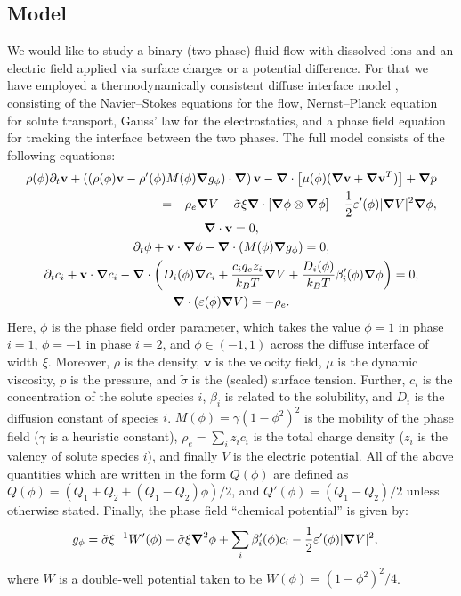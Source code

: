 \documentclass[a4paper,10pt]{article}
\renewcommand{\v}[1]{\mathbf{#1}}
\renewcommand{\v}[1]{\ensuremath{\mathbf{#1}}} %
\newcommand{\gv}[1]{\ensuremath{\mbox{\boldmath$ #1 $}}}
\newcommand{\grad}[1]{\gv{\nabla} #1} %
\renewcommand{\div}[1]{\gv{\nabla} \cdot #1} %
\newcommand{\laplacian}[1]{\grad^2 #1}
\newcommand{\pdt}[1]{\partial_t #1}
\begin{document}
\subsection*{Model}
We would like to study a binary (two-phase) fluid flow with dissolved ions and an electric field applied via surface charges or a potential difference.
For that we have employed a thermodynamically consistent diffuse interface model \cite{abels2012}, consisting of the Navier--Stokes equations for the flow, Nernst--Planck equation for solute transport, Gauss' law for the electrostatics, and a phase field equation for tracking the interface between the two phases.
The full model consists of the following equations:
\begin{gather}
  \begin{split}
  \rho(\phi) \pdt \v v + \left( \left(\rho(\phi) \v v - \rho'(\phi) M(\phi) \grad g_\phi  \right) \cdot \grad \right) \v v - \div \left[  \mu(\phi)(\grad \v v + \grad \v v ^T) \right] + \grad p \\
  = - \rho_e \grad V - \tilde \sigma \xi\div \left[ \grad \phi \otimes \grad \phi \right] - \frac 1 2 \varepsilon'(\phi) | \grad V |^2 \grad \phi,
  \end{split}\\
  \div \v v = 0, \\
  \pdt \phi + \v v \cdot \grad \phi - \div(M(\phi) \grad g_\phi ) = 0, \\
  \pdt c_i + \v v \cdot \grad c_i - \div \left( D_{i} (\phi) \grad c_i + \frac{c_i q_e  z_i}{k_B T} \grad V +\frac{D_i(\phi)}{k_B T}\beta_i'(\phi) \grad \phi \right) = 0, \\
  \div ( \varepsilon (\phi) \grad V ) = - \rho_e.
\end{gather}
Here, $\phi$ is the phase field order parameter, which takes the value $\phi = 1$ in phase $i=1$, $\phi = -1$ in phase $i=2$, and $\phi \in (-1, 1)$ across the diffuse interface of width $\xi$.
Moreover, $\rho$ is the density, $\v v$ is the velocity field, $\mu$ is the dynamic viscosity, $p$ is the pressure, and $\tilde{\sigma}$ is the (scaled) surface tension.
Further, $c_i$ is the concentration of the solute species $i$, $\beta_i$ is related to the solubility, and $D_i$ is the diffusion constant of species $i$. $M(\phi)= \gamma (1 - \phi^2)^2$ is the mobility of the phase field ($\gamma$ is a heuristic constant), $\rho_e = \sum_i z_i c_i$ is the total charge density ($z_i$ is the valency of solute species $i$), and finally $V$ is the electric potential. All of the above quantities which are written in the form $Q(\phi)$ are defined as $Q(\phi) = (Q_1+Q_2 + (Q_1-Q_2)\phi)/2$, and $Q'(\phi) = (Q_1-Q_2)/2$ unless otherwise stated. Finally, the phase field ``chemical potential'' is given by:
\begin{align}
 g_\phi &= \tilde\sigma\xi^{-1}W'(\phi) - \tilde\sigma\xi\laplacian\phi + \sum_i \beta_i'(\phi) c_i - \frac 1 2 \varepsilon'(\phi) | \grad V |^2 ,
\end{align}
where $W$ is a double-well potential taken to be $W(\phi) = (1 - \phi^2)^2/4$.
 
\end{document}
